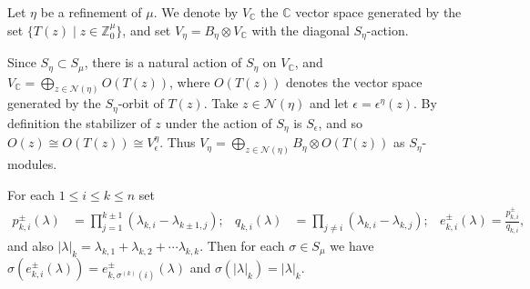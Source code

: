 \documentclass[11pt,fleqn]{article}
\newcommand\CC{\mathbb C}
\newcommand\ZZ{\mathbb Z}
\newcommand\N{\mathcal N}
\newcommand\ot{\otimes}
\begin{document}
\begin{Definition}
Let $\eta$ be a refinement of $\mu$. We denote by $V_\CC$ the $\CC$ vector 
space generated by the set $\{T(z) \mid z \in \ZZ^\mu_0\}$, and set $V_\eta =
B_\eta \ot V_\CC$ with the diagonal $S_\eta$-action. 
\end{Definition} 
Since $S_\eta \subset S_\mu$, there is a natural action of $S_\eta$ on $V_\CC$,
and $V_\CC = \bigoplus_{z \in \N(\eta)} O(T(z))$, where $O(T(z))$ denotes the
vector space generated by the $S_\eta$-orbit of $T(z)$. Take $z \in \N(\eta)$ 
and let $\epsilon = \epsilon^\eta(z)$. By definition the stabilizer of $z$ 
under the action of $S_\eta$ is $S_{\epsilon}$, and so $O(z) \cong O(T(z))
\cong V_\epsilon^\eta$. Thus $V_\eta = \bigoplus_{z \in \N(\eta)} B_\eta \ot 
O(T(z))$ as $S_\eta$-modules. 

For each $1 \leq i \leq k \leq n$ set
\begin{align*}
p_{k,i}^\pm(\lambda) 
  &= \prod_{j = 1}^{k\pm1}(\lambda_{k,i} -\lambda_{k\pm1,j}); &
q_{k,i}(\lambda)
  &= \prod_{j \neq i} (\lambda_{k,i} - \lambda_{k,j}); 
& e_{k,i}^\pm(\lambda) = \frac{p_{k,i}^\pm}{q_{k,i}},
\end{align*}
and also $|\lambda|_k = \lambda_{k,1} + \lambda_{k,2} + \cdots \lambda_{k,k}$.
Then for each $\sigma \in S_\mu$ we have $\sigma (e^\pm_{k,i}(\lambda)) = 
e^\pm_{k,\sigma^{(k)}(i)}(\lambda)$ and $\sigma(|\lambda|_k) = |\lambda|_k$.
\end{document}
